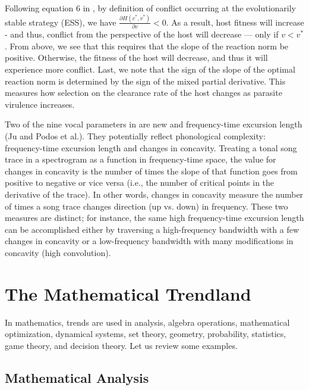 \documentclass[11pt]{book}
\begin{document}
Following equation 6 in \cite{day2018role}, by definition of conflict
occurring at the evolutionarily stable strategy (ESS), we have $\frac{\partial H\left(c^{*},v^{*}\right)}{\partial v}<0$.
As a result, host fitness will increase - and thus, conflict from
the perspective of the host will decrease --- only if $v<v^{*}$.
From above, we see that this requires that the slope of the reaction
norm be positive. Otherwise, the fitness of the host will decrease,
and thus it will experience more conflict. Last, we note that the
sign of the slope of the optimal reaction norm is determined by the
sign of the mixed partial derivative. This measures how selection
on the clearance rate of the host changes as parasite virulence increases.

Two of the nine vocal parameters in \cite{ju2019four} are new and
frequency-time excursion length (Ju and Podos et al.). They potentially
reflect phonological complexity: frequency-time excursion length and
changes in concavity. Treating a tonal song trace in a spectrogram
as a function in frequency-time space, the value for changes in concavity
is the number of times the slope of that function goes from positive
to negative or vice versa (i.e., the number of critical points in
the derivative of the trace). In other words, changes in concavity
measure the number of times a song trace changes direction (up vs.
down) in frequency. These two measures are distinct; for instance,
the same high frequency-time excursion length can be accomplished
either by traversing a high-frequency bandwidth with a few changes
in concavity or a low-frequency bandwidth with many modifications
in concavity (high convolution).

 

\chapter{The Mathematical Trendland}

In mathematics, trends are used in analysis, algebra operations, mathematical optimization, dynamical systems, set theory, geometry, probability, statistics, game theory, and decision theory. Let us review some examples.


\section{Mathematical Analysis}
\end{document}
